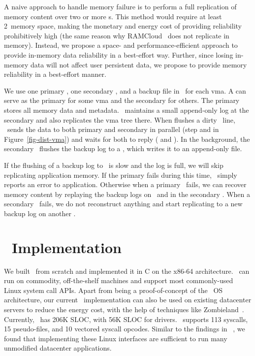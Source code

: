 \documentclass[10pt,times,twocolumn]{z2-article}
\newcommand*\circled[1]{\tikz[baseline=-3pt]{
            \node[shape=circle,draw,inner sep=1pt,minimum size=10pt] (char) {\small #1};}}
\begin{document}
{{{{{{{A naive approach to handle memory failure is to perform a full replication of memory content over two or more \mcomponent{}s.
This method would require at least 2\x\ memory space,
making the monetary and energy cost of providing reliability prohibitively high (the same reason why RAMCloud~\cite{Ongaro11-RamCloud} does not replicate in memory).
Instead, we propose a space- and performance-efficient approach to provide in-memory data reliability in a best-effort way.
Further, since losing in-memory data will not affect user persistent data,
we propose to provide memory reliability in a best-effort manner.

We use one primary \mcomponent, one secondary \mcomponent, and a backup file in \scomponent\ for each vma.
A \mcomponent{} can serve as the primary for some vma and the secondary for others.
The primary stores all memory data and metadata. %
\lego\ maintains a small append-only log at the secondary \mcomponent{}
and also replicates the vma tree there.
When \pcomponent{} flushes a dirty \excache\ line, 
\lego\ sends the data to both primary and secondary in parallel (step \circled{a} and \circled{b} in Figure~\ref{fig-dist-vma})
and waits for both to reply (\circled{c} and \circled{d}).
In the background, the secondary \mcomponent\ flushes the backup log to a \scomponent{},
which writes it to an append-only file.

If the flushing of a backup log to \scomponent\ is slow and the log is full, 
we will skip replicating application memory.
If the primary fails during this time, \lego\ simply reports an error to application.
Otherwise when a primary \mcomponent\ fails, we can recover memory content 
by replaying the backup logs on \scomponent\ and in the secondary \mcomponent.
When a secondary \mcomponent\ fails, we do not reconstruct anything 
and start replicating to a new backup log on another \mcomponent{}.

\section{\lego\ Implementation}
\label{sec:impl}

We built \lego\ from scratch
and implemented it in C on the x86-64 architecture.
\lego\ can run on commodity, off-the-shelf machines 
and support most commonly-used Linux system call APIs.
Apart from being a proof-of-concept of the \splitkernel\ OS architecture,
our current \lego\ implementation can also be used on existing datacenter servers to reduce the energy cost,
with the help of techniques like Zombieland~\cite{Nitu18-EUROSYS}.
Currently, \lego\ has 206K SLOC,
with 56K SLOC for drivers.
\lego\ supports 113 syscalls, 15 pseudo-files,
and 10 vectored syscall opcodes. 
Similar to the findings in ~\cite{tsai-eurosys16}, we found that implementing these Linux interfaces
are sufficient to run many unmodified datacenter applications.


}}}}}}}
\end{document}

